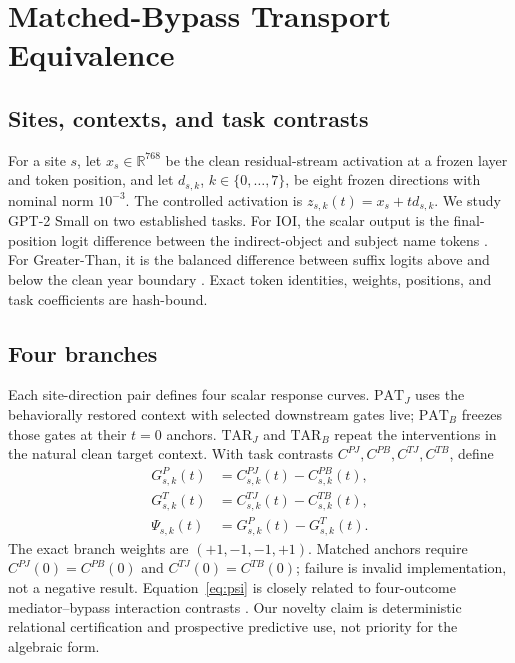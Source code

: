 \documentclass{article}
\newcommand{\R}{\mathbb{R}}
\newcommand{\pat}{\mathrm{PAT}}
\newcommand{\tar}{\mathrm{TAR}}
\begin{document}
\section{Matched-Bypass Transport Equivalence}
\label{sec:estimand}

\subsection{Sites, contexts, and task contrasts}
For a site $s$, let $x_s\in\R^{768}$ be the clean residual-stream activation at a frozen layer and token position, and let $d_{s,k}$, $k\in\{0,\ldots,7\}$, be eight frozen directions with nominal norm $10^{-3}$. The controlled activation is $z_{s,k}(t)=x_s+t d_{s,k}$. We study GPT-2 Small on two established tasks. For IOI, the scalar output is the final-position logit difference between the indirect-object and subject name tokens \citep{wang2022interpretability}. For Greater-Than, it is the balanced difference between suffix logits above and below the clean year boundary \citep{hanna2023greater}. Exact token identities, weights, positions, and task coefficients are hash-bound.

\subsection{Four branches}
Each site-direction pair defines four scalar response curves. $\pat_J$ uses the behaviorally restored context with selected downstream gates live; $\pat_B$ freezes those gates at their $t=0$ anchors. $\tar_J$ and $\tar_B$ repeat the interventions in the natural clean target context. With task contrasts $C^{PJ},C^{PB},C^{TJ},C^{TB}$, define
\begin{align}
    G^P_{s,k}(t)&=C^{PJ}_{s,k}(t)-C^{PB}_{s,k}(t),\\
    G^T_{s,k}(t)&=C^{TJ}_{s,k}(t)-C^{TB}_{s,k}(t),\\
    \Psi_{s,k}(t)&=G^P_{s,k}(t)-G^T_{s,k}(t).
    \label{eq:psi}
\end{align}
The exact branch weights are $(+1,-1,-1,+1)$. Matched anchors require $C^{PJ}(0)=C^{PB}(0)$ and $C^{TJ}(0)=C^{TB}(0)$; failure is invalid implementation, not a negative result. Equation~\ref{eq:psi} is closely related to four-outcome mediator--bypass interaction contrasts \citep{vaidyanathan2026mediators}. Our novelty claim is deterministic relational certification and prospective predictive use, not priority for the algebraic form.
\end{document}
